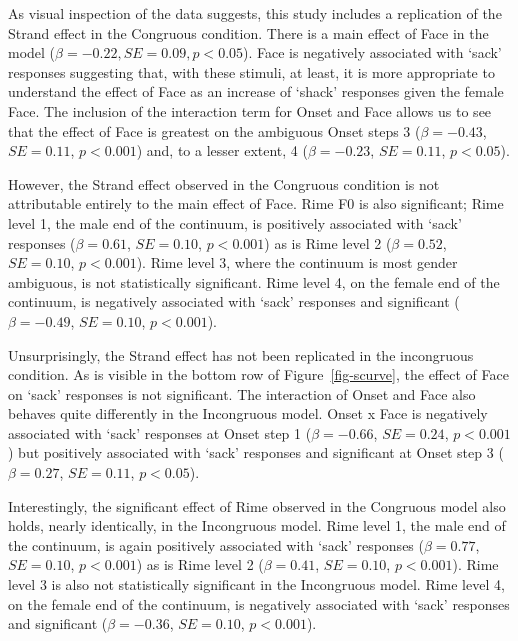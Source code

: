 \documentclass[
  letterpaper,
  DIV=11,
  numbers=noendperiod]{scrartcl}
\begin{document}
As visual inspection of the data suggests, this study includes a
replication of the Strand effect in the Congruous condition. There is a
main effect of Face in the model (\(β=-0.22, SE=0.09, p<0.05\)). Face is
negatively associated with `sack' responses suggesting that, with these
stimuli, at least, it is more appropriate to understand the effect of
Face as an increase of `shack' responses given the female Face. The
inclusion of the interaction term for Onset and Face allows us to see
that the effect of Face is greatest on the ambiguous Onset steps 3
(\(β=-0.43\), \(SE=0.11\), \(p < 0.001\)) and, to a lesser extent, 4
(\(β=-0.23\), \(SE=0.11\), \(p < 0.05\)).

However, the Strand effect observed in the Congruous condition is not
attributable entirely to the main effect of Face. Rime F0 is also
significant; Rime level 1, the male end of the continuum, is positively
associated with `sack' responses (\(β=0.61\), \(SE=0.10\),
\(p < 0.001\)) as is Rime level 2 (\(β=0.52\), \(SE=0.10\),
\(p < 0.001\)). Rime level 3, where the continuum is most gender
ambiguous, is not statistically significant. Rime level 4, on the female
end of the continuum, is negatively associated with `sack' responses and
significant (\(β=-0.49\), \(SE=0.10\), \(p < 0.001\)).

Unsurprisingly, the Strand effect has not been replicated in the
incongruous condition. As is visible in the bottom row of
Figure~\ref{fig-scurve}, the effect of Face on `sack' responses is not
significant. The interaction of Onset and Face also behaves quite
differently in the Incongruous model. Onset x Face is negatively
associated with `sack' responses at Onset step 1 (\(β=-0.66\),
\(SE=0.24\), \(p < 0.001\)) but positively associated with `sack'
responses and significant at Onset step 3 (\(β=0.27\), \(SE=0.11\),
\(p < 0.05\)).

Interestingly, the significant effect of Rime observed in the Congruous
model also holds, nearly identically, in the Incongruous model. Rime
level 1, the male end of the continuum, is again positively associated
with `sack' responses (\(β=0.77\), \(SE=0.10\), \(p < 0.001\)) as is
Rime level 2 (\(β=0.41\), \(SE=0.10\), \(p < 0.001\)). Rime level 3 is
also not statistically significant in the Incongruous model. Rime level
4, on the female end of the continuum, is negatively associated with
`sack' responses and significant (\(β=-0.36\), \(SE=0.10\),
\(p < 0.001\)).
\end{document}
